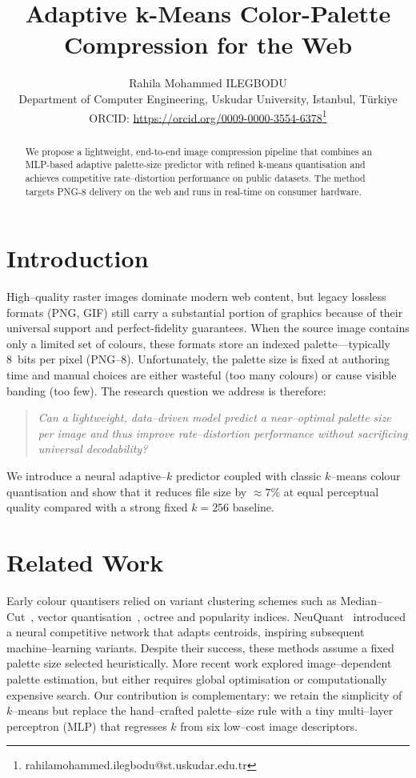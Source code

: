 \documentclass{../manuscript/Electrical new template/elektr}
\title{Adaptive k-Means Color-Palette Compression for the Web}
\author[ILEGBODU]{Rahila Mohammed ILEGBODU\\
Department of Computer Engineering, Uskudar University, Istanbul, Türkiye\\
ORCID: \url{https://orcid.org/0009-0000-3554-6378}\thanks{rahilamohammed.ilegbodu@st.uskudar.edu.tr}\\
\rec{}\acc{}\finv{}
}
\begin{document}
\maketitle

\begin{abstract}
We propose a lightweight, end-to-end image compression pipeline that combines an MLP-based adaptive palette-size predictor with refined k-means quantisation and achieves competitive rate–distortion performance on public datasets.  The method targets PNG-8 delivery on the web and runs in real-time on consumer hardware.
\end{abstract}


\section{Introduction}
High--quality raster images dominate modern web content, but legacy lossless formats (PNG, GIF) still
carry a substantial portion of graphics because of their universal support and perfect-fidelity
guarantees.  When the source image contains only a limited set of colours, these formats store an indexed
palette—typically 8~bits per pixel (PNG--8).  Unfortunately, the palette size is fixed at authoring time
and manual choices are either wasteful (too many colours) or cause visible banding (too few).  The
research question we address is therefore: 

\begin{quote}
\emph{Can a lightweight, data--driven model predict a near--optimal palette size per image and thus
improve rate--distortion performance without sacrificing universal decodability?}
\end{quote}

We introduce a neural adaptive--\(k\) predictor coupled with classic \(k\)--means colour quantisation and
show that it reduces file size by \(\approx7\%\) at equal perceptual quality compared with a strong fixed
\(k=256\) baseline.

\section{Related Work}
Early colour quantisers relied on variant clustering schemes such as Median--Cut~\cite{median_cut},
vector quantisation~\cite{kmeans_quant}, octree and popularity indices.  NeuQuant~\cite{neuquant}
introduced a neural competitive network that adapts centroids, inspiring subsequent machine--learning
variants.  Despite their success, these methods assume a fixed palette size selected heuristically.  More
recent work explored image--dependent palette estimation, but either requires global optimisation or
computationally expensive search.  Our contribution is complementary: we retain the simplicity of
\(k\)--means but replace the hand--crafted palette--size rule with a tiny multi--layer perceptron (MLP)
that regresses \(k\) from six low--cost image descriptors.
\end{document}

